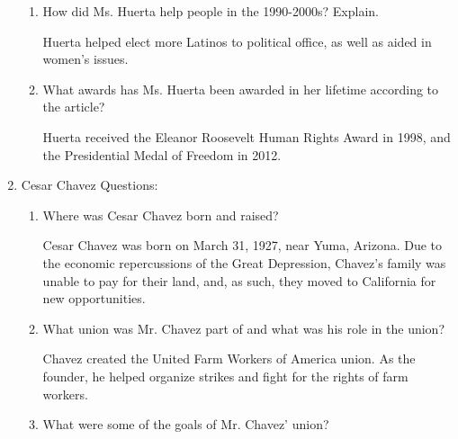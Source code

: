 \documentclass[12pt]{article}
\begin{document}
\begin{enumerate}
\begin{enumerate}
      \item How did Ms. Huerta help people in the 1990-2000s? Explain.

        \begin{justify}

          Huerta helped elect more Latinos to political office, as well as aided in women's issues.

        \end{justify}

      \item What awards has Ms. Huerta been awarded in her lifetime according to the article?

        \begin{justify}

          Huerta received the Eleanor Roosevelt Human Rights Award in 1998, and the Presidential Medal of Freedom in 2012.

        \end{justify}

    \end{enumerate}

  \item Cesar Chavez Questions:

    \begin{enumerate}

      \item Where was Cesar Chavez born and raised?

        \begin{justify}

          Cesar Chavez was born on March 31, 1927, near Yuma, Arizona. Due to the economic repercussions of the Great Depression, Chavez's family was unable to pay for their land, and, as such, they moved to California for new opportunities.

        \end{justify}

      \item What union was Mr. Chavez part of and what was his role in the union?

        \begin{justify}

          Chavez created the United Farm Workers of America union. As the founder, he helped organize strikes and fight for the rights of farm workers.

        \end{justify}

      \item What were some of the goals of Mr. Chavez' union?


\end{enumerate}
\end{enumerate}
\end{document}
